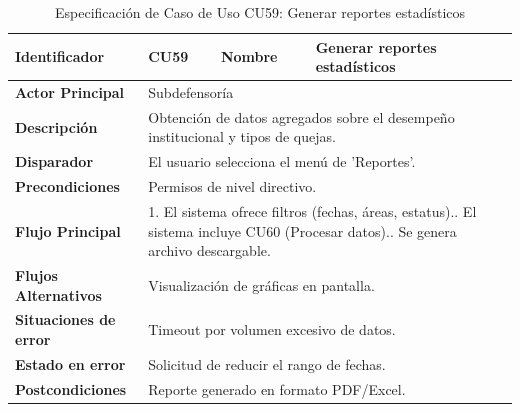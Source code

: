 \begingroup
\setlength{\parskip}{0pt}
\begin{longtable}{|p{3.5cm}|p{2cm}|p{2.5cm}|p{7cm}|}
\caption{Especificación de Caso de Uso CU59: Generar reportes estadísticos}
\label{tab:cu59} \\
\hline
\textbf{Identificador} & CU59 & \textbf{Nombre} & Generar reportes estadísticos \\ \hline
\textbf{Actor Principal} & \multicolumn{3}{p{11.5cm}|}{Subdefensoría} \\ \hline
\textbf{Descripción} & \multicolumn{3}{p{11.5cm}|}{Obtención de datos agregados sobre el desempeño institucional y tipos de quejas.} \\ \hline
\textbf{Disparador} & \multicolumn{3}{p{11.5cm}|}{El usuario selecciona el menú de 'Reportes'.} \\ \hline
\textbf{Precondiciones} & \multicolumn{3}{p{11.5cm}|}{Permisos de nivel directivo.} \\ \hline
\textbf{Flujo Principal} & \multicolumn{3}{p{11.5cm}|}{1. El sistema ofrece filtros (fechas, áreas, estatus).\newline 2. El sistema incluye CU60 (Procesar datos).\newline 3. Se genera archivo descargable.} \\ \hline
\textbf{Flujos Alternativos} & \multicolumn{3}{p{11.5cm}|}{Visualización de gráficas en pantalla.} \\ \hline
\textbf{Situaciones de error} & \multicolumn{3}{p{11.5cm}|}{Timeout por volumen excesivo de datos.} \\ \hline
\textbf{Estado en error} & \multicolumn{3}{p{11.5cm}|}{Solicitud de reducir el rango de fechas.} \\ \hline
\textbf{Postcondiciones} & \multicolumn{3}{p{11.5cm}|}{Reporte generado en formato PDF/Excel.} \\ \hline
\end{longtable}
\endgroup

\vspace{0.8cm}

